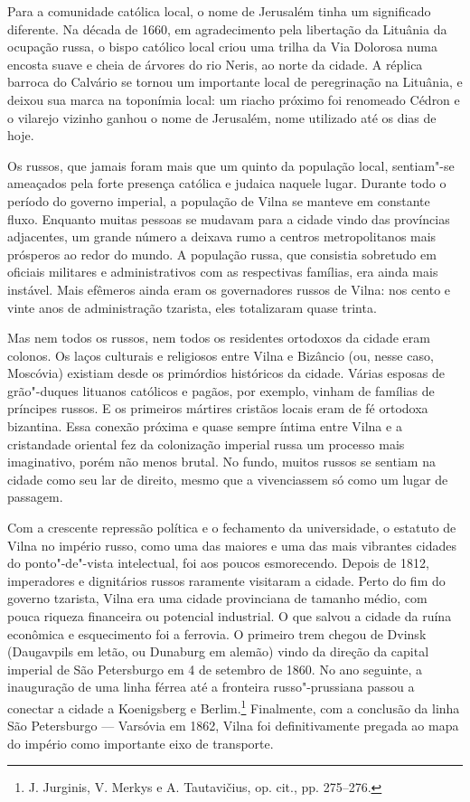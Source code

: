 Para a comunidade católica local, o nome de Jerusalém tinha um
significado diferente. Na década de 1660, em agradecimento pela
libertação da Lituânia da ocupação russa, o bispo católico local criou
uma trilha da Via Dolorosa numa encosta suave e cheia de árvores do rio
Neris, ao norte da cidade. A réplica barroca do Calvário se tornou um
importante local de peregrinação na Lituânia, e deixou sua marca na
toponímia local: um riacho próximo foi renomeado Cédron e o vilarejo
vizinho ganhou o nome de Jerusalém, nome utilizado até os dias de hoje.

Os russos, que jamais foram mais que um quinto da população local,
sentiam"-se ameaçados pela forte presença católica e judaica naquele
lugar. Durante todo o período do governo imperial, a população de Vilna
se manteve em constante fluxo. Enquanto muitas pessoas se mudavam para a
cidade vindo das províncias adjacentes, um grande número a deixava rumo
a centros metropolitanos mais prósperos ao redor do mundo. A população
russa, que consistia sobretudo em oficiais militares e administrativos
com as respectivas famílias, era ainda mais instável. Mais efêmeros
ainda eram os governadores russos de Vilna: nos cento e vinte anos de
administração tzarista, eles totalizaram quase trinta.

Mas nem todos os russos, nem todos os residentes ortodoxos da cidade
eram colonos. Os laços culturais e religiosos entre Vilna e Bizâncio
(ou, nesse caso, Moscóvia) existiam desde os primórdios históricos da
cidade. Várias esposas de grão"-duques lituanos católicos e pagãos, por
exemplo, vinham de famílias de príncipes russos. E os primeiros mártires
cristãos locais eram de fé ortodoxa bizantina. Essa conexão próxima e
quase sempre íntima entre Vilna e a cristandade oriental fez da
colonização imperial russa um processo mais imaginativo, porém não menos
brutal. No fundo, muitos russos se sentiam na cidade como seu lar de
direito, mesmo que a vivenciassem só como um lugar de passagem.

Com a crescente repressão política e o fechamento da universidade, o
estatuto de Vilna no império russo, como uma das maiores e uma das mais
vibrantes cidades do ponto"-de"-vista intelectual, foi aos poucos
esmorecendo. Depois de 1812, imperadores e dignitários russos raramente
visitaram a cidade. Perto do fim do governo tzarista, Vilna era uma
cidade provinciana de tamanho médio, com pouca riqueza financeira ou
potencial industrial. O que salvou a cidade da ruína econômica e
esquecimento foi a ferrovia. O primeiro trem chegou de Dvinsk
(Daugavpils em letão, ou Dunaburg em alemão) vindo da direção da capital
imperial de São Petersburgo em 4 de setembro de 1860. No ano seguinte, a
inauguração de uma linha férrea até a fronteira russo"-prussiana passou a
conectar a cidade a Koenigsberg e Berlim.\footnote{J. Jurginis, V.
  Merkys e A. Tautavičius, op. cit., pp. 275--276.} Finalmente, com a
conclusão da linha São Petersburgo --- Varsóvia em 1862, Vilna foi
definitivamente pregada ao mapa do império como importante eixo de
transporte.

